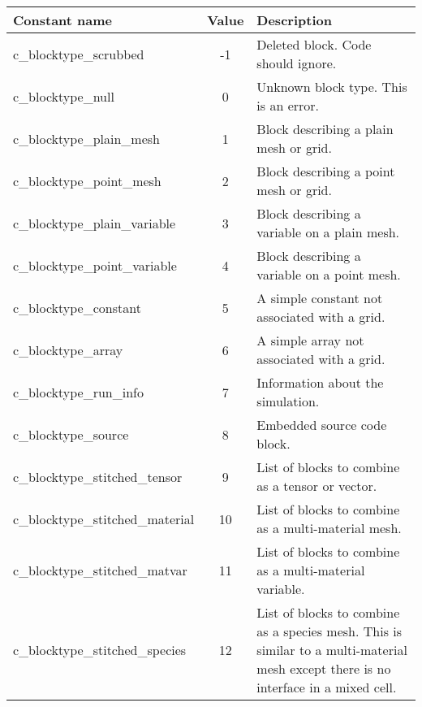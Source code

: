 \documentclass[12pt]{article}
\begin{document}
\begin{center}
\begin{tabularx}{0.9\textwidth}[!hbt]{lcX}
  Constant name & Value & Description
  \\\toprule

  c\_blocktype\_scrubbed & -1 & Deleted block. Code should ignore.
  \\\midrule

  c\_blocktype\_null & 0 & Unknown block type. This is an error.
  \\\midrule

  c\_blocktype\_plain\_mesh & 1 & Block describing a plain mesh or grid.
  \\\midrule

  c\_blocktype\_point\_mesh & 2 & Block describing a point mesh or grid.
  \\\midrule

  c\_blocktype\_plain\_variable & 3 & Block describing a variable on
  a plain mesh.
  \\\midrule

  c\_blocktype\_point\_variable & 4 & Block describing a variable on
  a point mesh.
  \\\midrule

  c\_blocktype\_constant & 5 & A simple constant not associated with a grid.
  \\\midrule

  c\_blocktype\_array & 6 & A simple array not associated with a grid.
  \\\midrule

  c\_blocktype\_run\_info & 7 & Information about the simulation.
  \\\midrule

  c\_blocktype\_source & 8 & Embedded source code block.
  \\\midrule

  c\_blocktype\_stitched\_tensor & 9 & List of blocks to combine as a tensor
  or vector.
  \\\midrule

  c\_blocktype\_stitched\_material & 10 & List of blocks to combine as a
  multi-material mesh.
  \\\midrule

  c\_blocktype\_stitched\_matvar & 11 & List of blocks to combine as a
  multi-material variable.
  \\\midrule

  c\_blocktype\_stitched\_species & 12 & List of blocks to combine as a
  species mesh. This is similar to a multi-material mesh except there is
  no interface in a mixed cell.
  \\\midrule


\end{tabularx}
\end{center}
\end{document}
